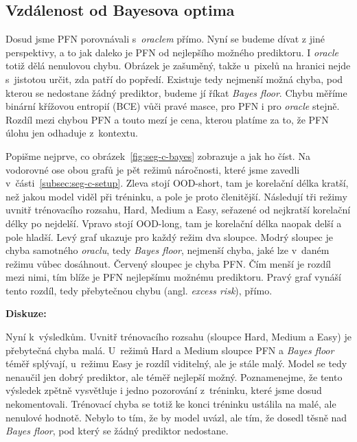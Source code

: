\FloatBarrier

\subsection{Vzdálenost od Bayesova optima}
\label{subsec:seg-c-bayes}

Dosud jsme PFN porovnávali s~\emph{oraclem} přímo.
Nyní se budeme dívat z jiné perspektivy, a to jak daleko je PFN od nejlepšího možného prediktoru.
I \emph{oracle} totiž dělá nenulovou chybu.
Obrázek je zašuměný, takže u~pixelů na hranici nejde s~jistotou určit, zda patří do popředí.
Existuje tedy nejmenší možná chyba, pod kterou se nedostane žádný prediktor, budeme jí říkat \emph{Bayes floor}.
Chybu měříme binární křížovou entropií (BCE) vůči pravé masce, pro PFN i pro \emph{oracle} stejně.
Rozdíl mezi chybou PFN a touto mezí je cena, kterou platíme za to, že PFN úlohu jen odhaduje z~kontextu.
\par

Popišme nejprve, co obrázek~\ref{fig:seg-c-bayes} zobrazuje a jak ho číst.
Na vodorovné ose obou grafů je pět režimů náročnosti, které jsme zavedli v~části~\ref{subsec:seg-c-setup}.
Zleva stojí OOD-short, tam je korelační délka kratší, než jakou model viděl při tréninku, a pole je proto členitější.
Následují tři režimy uvnitř trénovacího rozsahu, Hard, Medium a Easy, seřazené od nejkratší korelační délky po nejdelší.
Vpravo stojí OOD-long, tam je korelační délka naopak delší a pole hladší.
Levý graf ukazuje pro každý režim dva sloupce.
Modrý sloupec je chyba samotného \emph{oraclu}, tedy \emph{Bayes floor}, nejmenší chyba, jaké lze v~daném režimu vůbec dosáhnout.
Červený sloupec je chyba PFN.
Čím menší je rozdíl mezi nimi, tím blíže je PFN nejlepšímu možnému prediktoru.
Pravý graf vynáší tento rozdíl, tedy přebytečnou chybu (angl. \emph{excess risk}), přímo.
\par

\textbf{Diskuze:}

Nyní k~výsledkům.
Uvnitř trénovacího rozsahu (sloupce Hard, Medium a Easy) je přebytečná chyba malá.
U~režimů Hard a Medium sloupce PFN a \emph{Bayes floor} téměř splývají, u~režimu Easy je rozdíl viditelný, ale je stále malý.
Model se tedy nenaučil jen dobrý prediktor, ale téměř nejlepší možný.
Poznamenejme, že tento výsledek zpětně vysvětluje i jedno pozorování z~tréninku, které jsme dosud nekomentovali.
Trénovací chyba se totiž ke konci tréninku ustálila na malé, ale nenulové hodnotě.
Nebylo to tím, že by model uvázl, ale tím, že dosedl těsně nad \emph{Bayes floor}, pod který se žádný prediktor nedostane.
\par

